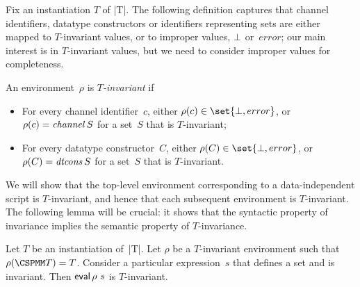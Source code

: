 
Fix an instantiation $T$ of |T|.
The following definition captures that channel identifiers, datatype
constructors or identifiers representing sets are either mapped to
$T$-invariant values, or to improper values, $\perp$ or~$error$; our main
interest is in $T$-invariant values, but we need to consider improper values
for completeness.
%
\begin{definition}
An environment~$\rho$ is \emph{$T$-invariant} if
%
\begin{itemize}
\item For every channel identifier~$c$, either $\rho(c) \in \set{\bottom,
  error}$, or $\rho(c) = \mathop{\it channel} S$ for a set~$S$ that is $T$-invariant;

\item For every datatype constructor~$C$, either $\rho(C) \in \set{\bottom,
  error}$, or $\rho(C) = \mathop{\it dtcons} S$ for a set~$S$ that is $T$-invariant.
\end{itemize}
%
\end{definition}

We will show that the top-level environment corresponding to a
data-independent script is  $T$-invariant, and hence that each
subsequent environment is $T$-invariant.  The following lemma will be crucial:
it shows that the syntactic property of invariance implies the semantic
property of $T$-invariance.
%
\begin{lemma}
\label{lem:invariant}
Let $T$ be an instantiation of~|T|.  Let $\rho$ be a  $T$-invariant
environment such that $\rho(\M T) = T$.
%
Consider a particular expression~$s$ that defines a set and is invariant.
Then $\mathop{\sf eval} \rho~s$ is $T$-invariant.
\end{lemma}

